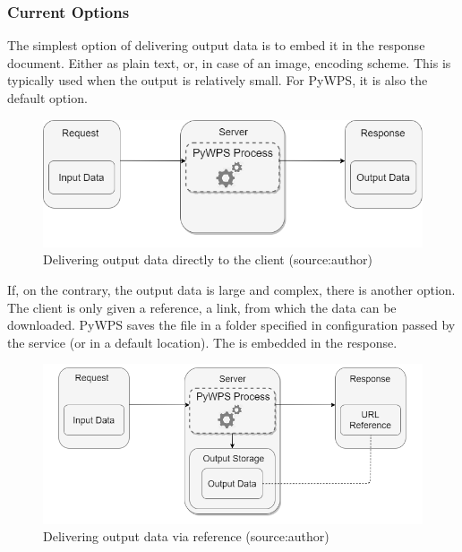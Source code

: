 \subsubsection{Current Options} 

The simplest option of delivering output data is to embed it in the
 response document. Either as plain text,  or, in case
of an image, encoding scheme. This is typically used when the output is
relatively small. For PyWPS, it is also the default option.

\begin{figure}[H] \centering
  \includegraphics[width=350pt]{./pictures/optionone.png}
      \caption[Delivering output data directly to the client]{Delivering output data directly to the client (source:{author})}
      \label{fig:optionone}
  \end{figure}
  

  If, on the contrary, the output data is large and complex, there is
  another option. The client is only given a reference, a 
  link, from which the data can be downloaded. PyWPS saves the file in
  a folder specified in configuration passed by the service (or in a
  default location). The  is embedded in the 
  response. \cite{pywpsurl}


\begin{figure}[H] \centering
  \includegraphics[width=370pt]{./pictures/optiontwo.png}
      \caption[Delivering output data via  reference]{Delivering output data via  reference (source:{author})}
      \label{fig:optiontwo}
  \end{figure}

